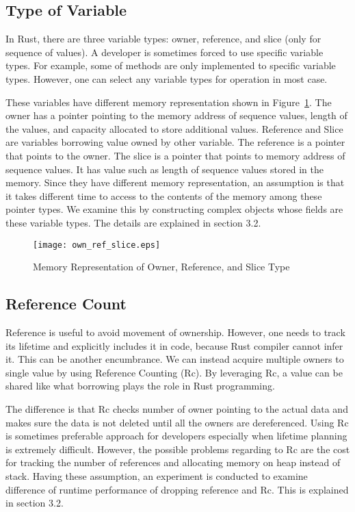 \subsection{Type of Variable}
\label{sec:concept_diffval}
In Rust, there are three variable types: owner, reference, and slice (only for sequence of values). 
A developer is sometimes forced to use specific variable types. For example, some of methods are only implemented to specific variable types.
However, one can select any variable types for operation in most case.

These variables have different memory representation shown in Figure~\ref{fig:own_ref_slice}.
The owner has a pointer pointing to the memory address of sequence values, length of the values, and capacity allocated to store additional values. 
Reference and Slice are variables borrowing value owned by other variable. The reference is a pointer that points to the owner. 
The slice is a pointer that points to memory address of sequence values. It has value such as length of sequence values stored in the memory. 
Since they have different memory representation, an assumption is that it takes different time to access to the contents of the memory among these pointer types.
We examine this by constructing complex objects whose fields are these variable types. The details are explained in section 3.2.

\begin{figure}[htb]
    \texttt{[image: own\_ref\_slice.eps]}
    \caption{Memory Representation of Owner, Reference, and Slice Type}
    \label{fig:own_ref_slice}
\end{figure}

\subsection{Reference Count}
\label{sec:concept_refcount}
Reference is useful to avoid movement of ownership. However, one needs to track its lifetime and explicitly includes it in code, 
because Rust compiler cannot infer it. This can be another encumbrance. We can instead acquire multiple owners to single value by using Reference Counting (Rc). 
By leveraging Rc, a value can be shared like what borrowing plays the role in Rust programming. 

The difference is that Rc checks number of owner pointing to the actual data and makes sure the data is not deleted 
until all the owners are dereferenced. Using Rc is sometimes preferable approach for developers especially when lifetime planning is extremely difficult.
However, the possible problems regarding to Rc are the cost for tracking the number of references and allocating memory on heap instead of stack.
Having these assumption, an experiment is conducted to examine difference of runtime performance of dropping reference and Rc. 
This is explained in section 3.2.

